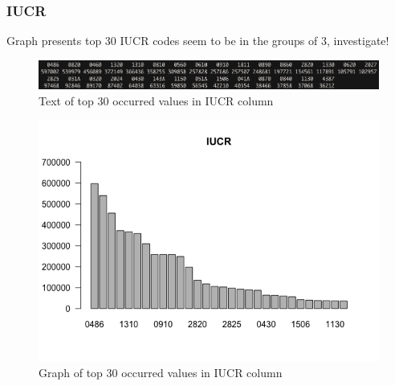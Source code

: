 \newpage
\subsubsection{IUCR}
Graph presents top 30
IUCR codes seem to be in the groups of 3, investigate!
\begin{figure}[H]
\includegraphics[scale=0.4]{images/EDA/IUCR.jpg}
\centering
\caption{Text of top 30 occurred values in IUCR column}
\end{figure}
\begin{figure}[H]
\includegraphics[scale=0.7]{images/EDA/IUCR.png}
\centering
\caption{Graph of top 30 occurred values in IUCR column}
\end{figure}